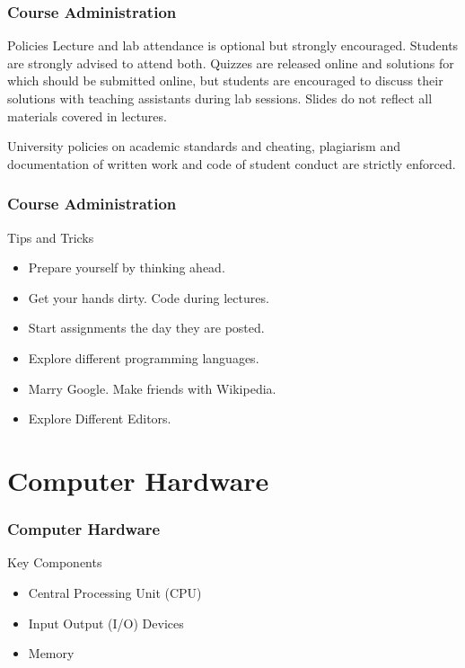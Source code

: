 \documentclass[10pt, compress]{beamer}
\begin{document}
\begin{frame}
	\frametitle{Course Administration}
	\begin{block}{Policies}
		Lecture and lab attendance is optional but strongly encouraged. Students are strongly advised to attend both. Quizzes are released online and solutions for which should be submitted online, but students are encouraged to discuss their solutions with teaching assistants during lab sessions. Slides do not reflect all materials covered in lectures.

		University policies on academic standards and cheating, plagiarism and documentation of written work and code of student conduct are strictly enforced.
	\end{block}
\end{frame}

\begin{frame}
	\frametitle{Course Administration}
	\begin{block}{Tips and Tricks}
		\begin{itemize}
			\item[] Prepare yourself by thinking ahead.
			\item[] Get your hands dirty. Code during lectures.
			\item[] Start assignments the day they are posted.
			\item[] Explore different programming languages.
			\item[] Marry Google. Make friends with Wikipedia.
			\item[] Explore Different Editors.
		\end{itemize}
	\end{block}
\end{frame}

\section{Computer Hardware}

\begin{frame}
	\frametitle{Computer Hardware}
	\begin{block}{Key Components}
		\begin{itemize}
			\item[] Central Processing Unit (CPU)
			\item[] Input Output (I/O) Devices
			\item[] Memory
		\end{itemize}
	\end{block}
\end{frame}
\end{document}
